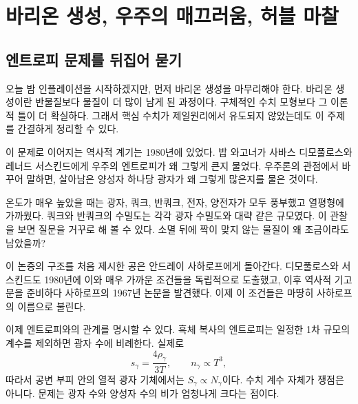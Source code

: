 \chapter{바리온 생성, 우주의 매끄러움, 허블 마찰}


\section{엔트로피 문제를 뒤집어 묻기}

오늘 밤 인플레이션을 시작하겠지만, 먼저 바리온 생성을 마무리해야 한다. 바리온 생성이란 반물질보다 물질이 더 많이 남게 된 과정이다. 구체적인 수치 모형보다 그 이론적 틀이 더 확실하다. 그래서 핵심 수치가 제일원리에서 유도되지 않았는데도 이 주제를 간결하게 정리할 수 있다.

이 문제로 이어지는 역사적 계기는 1980년에 있었다. 밥 와고너가 사바스 디모풀로스와 레너드 서스킨드에게 우주의 엔트로피가 왜 그렇게 큰지 물었다. 우주론의 관점에서 바꾸어 말하면, 살아남은 양성자 하나당 광자가 왜 그렇게 많은지를 물은 것이다.

온도가 매우 높았을 때는 광자, 쿼크, 반쿼크, 전자, 양전자가 모두 풍부했고 열평형에 가까웠다. 쿼크와 반쿼크의 수밀도는 각각 광자 수밀도와 대략 같은 규모였다. 이 관찰을 보면 질문을 거꾸로 해 볼 수 있다. 소멸 뒤에 짝이 맞지 않는 물질이 왜 조금이라도 남았을까?

이 논증의 구조를 처음 제시한 공은 안드레이 사하로프에게 돌아간다. 디모풀로스와 서스킨드도 1980년에 이와 매우 가까운 조건들을 독립적으로 도출했고, 이후 역사적 기고문을 준비하다 사하로프의 1967년 논문을 발견했다. 이제 이 조건들은 마땅히 사하로프의 이름으로 불린다.

이제 엔트로피와의 관계를 명시할 수 있다. 흑체 복사의 엔트로피는 일정한 1차 규모의 계수를 제외하면 광자 수에 비례한다. 실제로
\begin{equation}
s_\gamma=\frac{4\rho_\gamma}{3T},
\qquad
n_\gamma\propto T^3,
\end{equation}
따라서 공변 부피 안의 열적 광자 기체에서는 \(S_\gamma\propto N_\gamma\)이다. 수치 계수 자체가 쟁점은 아니다. 문제는 광자 수와 양성자 수의 비가 엄청나게 크다는 점이다.

